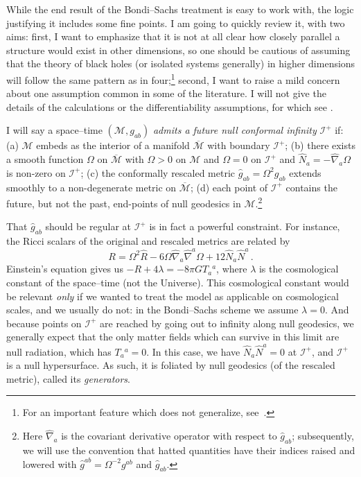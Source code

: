 \documentclass[
%
draft    %
,numberedheadings 
,bibliocites
  ]
  {aipproc}
\newcommand{\scrif}{{{\mathscr I}^{+}}}
\newcommand{\MM}{{\mathscr M}}
\begin{document}
While the end result of the Bondi--Sachs treatment is easy to work with, the logic justifying it includes some fine points.  I am going to quickly review it, with two aims:  first, I want to emphasize that it is not at all clear how closely parallel a structure would exist  in other dimensions, so one should be cautious of assuming that the theory of black holes (or isolated systems generally) in higher dimensions will follow the same pattern as in four;\footnote{For an important feature which does not generalize, see~\citet{Hollands:2004ac}.} second, I want to raise a mild concern about one assumption common in some of the literature.  I will not give the details of the calculations or the differentiability assumptions, for which see \citet{Penrose:1986ca}.

I will say a space--time $(\MM ,g_{ab})$ {\em admits a future null conformal infinity} $\scrif$ if: (a) $\MM$ embeds as the interior of a manifold $\overline\MM$ with boundary $\scrif$; (b) there exists a smooth function $\Omega$ on $\overline\MM$ with $\Omega >0$ on $\MM$ and $\Omega =0$ on $\scrif$
and ${\hat N}_a=-{\hat\nabla}_a\Omega$ is non-zero on $\scrif$; (c) the conformally rescaled metric ${\hat g}_{ab}=\Omega ^2g_{ab}$ extends smoothly to a non-degenerate metric on $\overline\MM$; (d) each point of $\scrif$ contains the future, but not the past, end-points of null geodesics in $\MM$.\footnote{Here $ {\hat\nabla}_a $ is the covariant derivative operator with respect to ${\hat g}_{ab}$; subsequently, we will use the convention that hatted quantities have their indices raised and lowered with ${\hat g}^{ab}=\Omega ^{-2}g^{ab}$ and ${\hat g}_{ab}$.}

That ${\hat g}_{ab}$ should be regular at $\scrif$ is in fact a powerful constraint.  For instance, the Ricci scalars of the 
original and rescaled metrics are related by
\begin{equation}\label{Rsc}
R=\Omega ^2{\hat R} -6\Omega{\hat\nabla}_a{\hat\nabla}^a\Omega +12{\hat N}_a{\hat N}^a\, .
\end{equation}
Einstein's equation gives us $-R+4\lambda =-8\pi G T_a{}^a$, where $\lambda$ is the cosmological constant of the space--time (not the Universe).  This
cosmological constant would be relevant {\em only} if we wanted to treat the model as applicable on cosmological scales, and we usually do not: in the Bondi--Sachs scheme we assume $\lambda =0$.  And
because points on $\scrif$ are reached by going out to infinity along null geodesics, we generally expect that the only matter fields which can survive in this limit are null radiation, which has $T_a{}^a=0$.  In this case,
we have 
${\hat N}_a{\hat N}^a=0$ at $\scrif$, and
$\scrif$ is 
a null hypersurface.
As such, it is foliated by null geodesics (of the rescaled metric), called its {\em generators}.
\end{document}
